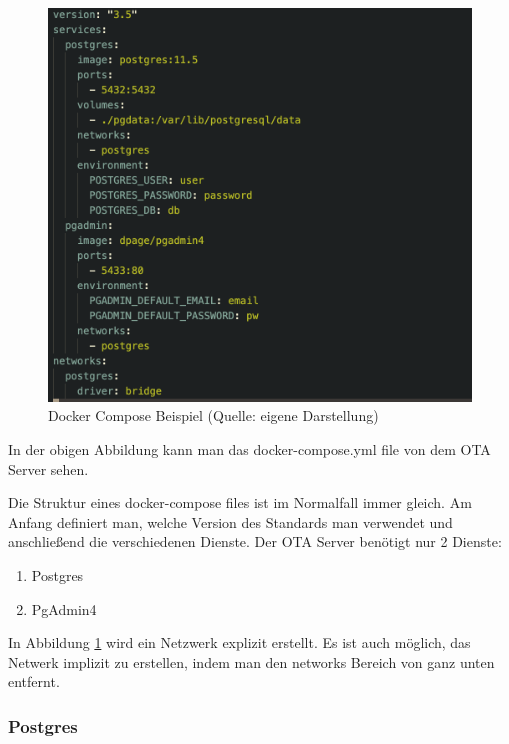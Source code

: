 \begin{figure}[H]
    \begin{center}
        \includegraphics[scale=0.8]{images/docker_compose_example.png}
        \caption{Docker Compose Beispiel (Quelle: eigene Darstellung)}
        \label{abb:docker-compose-example}
    \end{center}
\end{figure}

In der obigen Abbildung kann man das docker-compose.yml file von dem OTA Server sehen.

Die Struktur eines docker-compose files ist im Normalfall immer gleich. Am Anfang definiert man, welche Version des Standards man verwendet und anschließend die verschiedenen Dienste. Der OTA Server benötigt nur 2 Dienste:

\begin{enumerate}
    \item Postgres
    \item PgAdmin4
\end{enumerate}

In Abbildung \ref{abb:docker-compose-example} wird ein Netzwerk explizit erstellt. Es ist auch möglich, das Netwerk implizit zu erstellen, indem man den networks Bereich von ganz unten entfernt.

\subsubsection{Postgres}

